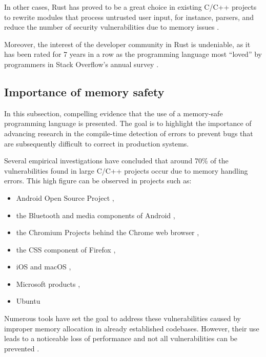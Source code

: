\documentclass[../Thesis.tex]{subfiles}
\begin{document}
In other cases, Rust has proved to be a great choice in existing C/C++ projects to rewrite modules
that process untrusted user input, for instance, parsers,
and reduce the number of security vulnerabilities due to memory issues \cite{chifflier2017writing}.

Moreover, the interest of the developer community in Rust is undeniable,
as it has been rated for 7 years in a row as the programming language most ``loved'' by programmers
in Stack Overflow's annual survey \cite{so-survey2022}.

\subsection{Importance of memory safety}

In this subsection, compelling evidence that the use of a memory-safe programming language is presented.
The goal is to highlight the importance of advancing research in the compile-time detection of errors
to prevent bugs that are subsequently difficult to correct in production systems.

Several empirical investigations have concluded that around 70\% of the vulnerabilities
found in large C/C++ projects occur due to memory handling errors.
This high figure can be observed in projects such as:

\begin{itemize}
      \item Android Open Source Project \cite{memory-bugs-android},
      \item the Bluetooth and media components of Android \cite{memory-bugs-android-media-bluetooth},
      \item the Chromium Projects behind the Chrome web browser \cite{memory-bugs-chrome},
      \item the CSS component of Firefox \cite{memory-bugs-firefox},
      \item iOS and macOS \cite{memory-bugs-ios-macos},
      \item Microsoft products \cite{miller-security-microsoft2019, memory-bugs-microsoft},
      \item Ubuntu \cite{memory-bugs-ubuntu}
\end{itemize}

Numerous tools have set the goal to address these vulnerabilities
caused by improper memory allocation in already established codebases.
However, their use leads to a noticeable loss of performance and
not all vulnerabilities can be prevented \cite{szekeres2013sok}.
\end{document}
